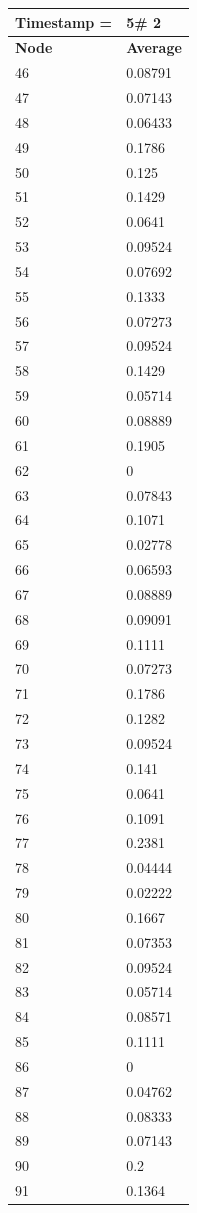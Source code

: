 \begin{tabular}{|l||l|}
\hline
\textbf{Timestamp =} & \textbf{5}\# 2\\\hline
	\textbf{Node} & \textbf{Average} \\ \hline
\hline
	46 & 0.08791 \\ \hline
	47 & 0.07143 \\ \hline
	48 & 0.06433 \\ \hline
	49 & 0.1786 \\ \hline
	50 & 0.125 \\ \hline
	51 & 0.1429 \\ \hline
	52 & 0.0641 \\ \hline
	53 & 0.09524 \\ \hline
	54 & 0.07692 \\ \hline
	55 & 0.1333 \\ \hline
	56 & 0.07273 \\ \hline
	57 & 0.09524 \\ \hline
	58 & 0.1429 \\ \hline
	59 & 0.05714 \\ \hline
	60 & 0.08889 \\ \hline
	61 & 0.1905 \\ \hline
	62 & 0 \\ \hline
	63 & 0.07843 \\ \hline
	64 & 0.1071 \\ \hline
	65 & 0.02778 \\ \hline
	66 & 0.06593 \\ \hline
	67 & 0.08889 \\ \hline
	68 & 0.09091 \\ \hline
	69 & 0.1111 \\ \hline
	70 & 0.07273 \\ \hline
	71 & 0.1786 \\ \hline
	72 & 0.1282 \\ \hline
	73 & 0.09524 \\ \hline
	74 & 0.141 \\ \hline
	75 & 0.0641 \\ \hline
	76 & 0.1091 \\ \hline
	77 & 0.2381 \\ \hline
	78 & 0.04444 \\ \hline
	79 & 0.02222 \\ \hline
	80 & 0.1667 \\ \hline
	81 & 0.07353 \\ \hline
	82 & 0.09524 \\ \hline
	83 & 0.05714 \\ \hline
	84 & 0.08571 \\ \hline
	85 & 0.1111 \\ \hline
	86 & 0 \\ \hline
	87 & 0.04762 \\ \hline
	88 & 0.08333 \\ \hline
	89 & 0.07143 \\ \hline
	90 & 0.2 \\ \hline
	91 & 0.1364 \\ \hline
\end{tabular}
